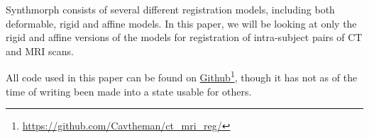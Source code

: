 Synthmorph consists of several different registration models, including both deformable, rigid and affine models. In this paper, we will be looking at only the rigid and affine versions of the models for registration of intra-subject pairs of CT and MRI scans.

All code used in this paper can be found on \href{https://github.com/Cavtheman/ct_mri_reg/}{Github}\footnote{\href{https://github.com/Cavtheman/ct_mri_reg/}{https://github.com/Cavtheman/ct\_mri\_reg/}}, though it has not as of the time of writing been made into a state usable for others.
